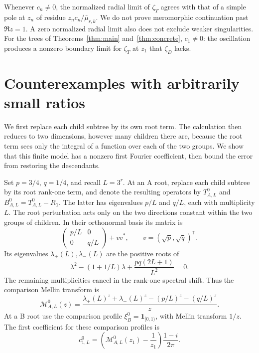 \documentclass[11pt]{article}
\theoremstyle{definition}
\theoremstyle{remark}
\newcommand{\one}{\mathbf 1}
\begin{document}
Whenever $c_n\ne0$, the normalized radial limit of $\zeta_T$ agrees
with that of a simple pole at $z_n$ of residue
$z_nc_n/\bar\mu_{r,k}$. We do not prove meromorphic continuation
past $\Re z=1$. A zero normalized radial limit also does not exclude
weaker singularities. For the trees of Theorems~\ref{thm:main}
and~\ref{thm:concrete}, $c_1\ne0$: the oscillation produces a nonzero
boundary limit for $\zeta_T$ at $z_1$ that $\zeta_D$ lacks.

\section{Counterexamples with arbitrarily small ratios}\label{sec:smallratios}

We first replace each child subtree by its own root term. The
calculation then reduces to two dimensions, however many children there
are, because the root term sees only the integral of a function over
each of the two groups. We show that this finite model has a nonzero
first Fourier coefficient, then bound the error from restoring the
descendants.

Set $p=3/4$, $q=1/4$, and recall $L=3^r$. At an A root, replace each
child subtree by its root rank-one term, and denote the resulting
operators by $T^0_{A,L}$ and $B^0_{A,L}=T^0_{A,L}-R_\one$.
The latter has eigenvalues $p/L$ and $q/L$, each with multiplicity $L$.
The root perturbation acts only on the two directions constant within
the two groups of children. In their orthonormal basis its matrix is
\begin{equation}\label{eq:ranktwo}
 \begin{pmatrix}p/L&0\\0&q/L\end{pmatrix}+vv^*,
 \qquad v=(\sqrt p,\sqrt q)^\mathsf T.
\end{equation}
Its eigenvalues $\lambda_+(L),\lambda_-(L)$ are the positive roots of
\[
 \lambda^2-(1+1/L)\lambda+\frac{pq(2L+1)}{L^2}=0.
\]
The remaining multiplicities cancel in the rank-one spectral shift.
Thus the comparison Mellin transform is
\[
 \mathcal M^0_{A,L}(z)=
 \frac{\lambda_+(L)^z+\lambda_-(L)^z-(p/L)^z-(q/L)^z}{z}.
\]
At a B root use the comparison profile $\xi_B^0=\one_{[0,1)}$, with
Mellin transform $1/z$. The first coefficient for these comparison
profiles is
\begin{equation}\label{eq:cL}
 c^0_{1,L}=\left(\mathcal M^0_{A,L}(z_1)-\frac1{z_1}\right)
 \frac{1-i}{2\pi}.
\end{equation}
\end{document}
